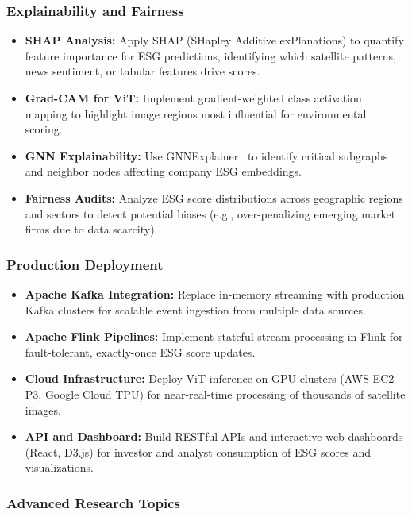 \subsubsection{Explainability and Fairness}

\begin{itemize}
\item \textbf{SHAP Analysis:} Apply SHAP (SHapley Additive exPlanations) to quantify feature importance for ESG predictions, identifying which satellite patterns, news sentiment, or tabular features drive scores.
\item \textbf{Grad-CAM for ViT:} Implement gradient-weighted class activation mapping to highlight image regions most influential for environmental scoring.
\item \textbf{GNN Explainability:} Use GNNExplainer~\cite{ying2019gnnexplainer} to identify critical subgraphs and neighbor nodes affecting company ESG embeddings.
\item \textbf{Fairness Audits:} Analyze ESG score distributions across geographic regions and sectors to detect potential biases (e.g., over-penalizing emerging market firms due to data scarcity).
\end{itemize}

\subsubsection{Production Deployment}

\begin{itemize}
\item \textbf{Apache Kafka Integration:} Replace in-memory streaming with production Kafka clusters for scalable event ingestion from multiple data sources.
\item \textbf{Apache Flink Pipelines:} Implement stateful stream processing in Flink for fault-tolerant, exactly-once ESG score updates.
\item \textbf{Cloud Infrastructure:} Deploy ViT inference on GPU clusters (AWS EC2 P3, Google Cloud TPU) for near-real-time processing of thousands of satellite images.
\item \textbf{API and Dashboard:} Build RESTful APIs and interactive web dashboards (React, D3.js) for investor and analyst consumption of ESG scores and visualizations.
\end{itemize}

\subsubsection{Advanced Research Topics}


